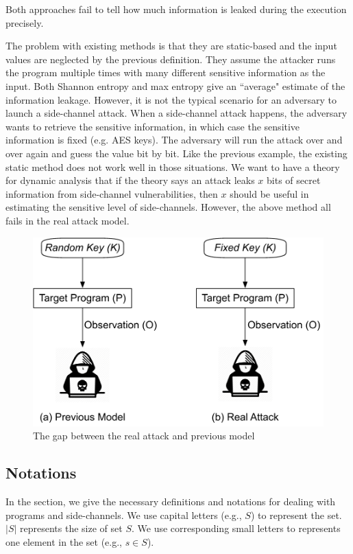 Both approaches fail to tell how 
much information is leaked during the execution precisely.

The problem with existing methods is that they are static-based and the 
input values are neglected by the previous definition. 
They assume the attacker runs the program multiple times with many different sensitive 
information as the input. Both Shannon entropy and max entropy give an ``average" 
estimate of the information leakage. However, it is not the typical scenario for an adversary to 
launch a side-channel attack. When a side-channel attack happens, the adversary wants 
to retrieve the sensitive information, in which case the sensitive information is fixed (e.g. AES keys). 
The adversary will run the attack over and over again and guess the value bit by bit. Like the 
previous example, the existing static method does not work well in those situations.
We want to have a theory for dynamic analysis that if the theory says 
an attack leaks $x$ bits of secret information from side-channel vulnerabilities,
then $x$ should be useful in estimating the sensitive level of side-channels.
However, the above method all fails in the real attack model.
\begin{figure}
  \centering
   \includegraphics[width=.9\columnwidth]{./figures/RA.pdf}
   \caption{The gap between the real attack and previous model}
\end{figure}


\subsection{Notations}
In the section, we give the necessary definitions and notations for dealing 
with programs and side-channels. We use capital letters (e.g., $S$) to represent 
the set. $|S|$ represents the size of set $S$. We use corresponding small letters
to represents one element in the set (e.g., $s \in S$).

